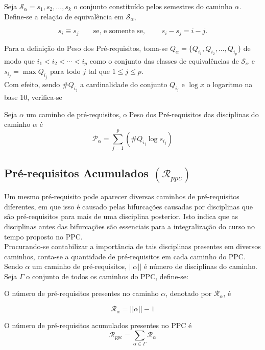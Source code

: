 \documentclass[a4paper, 12pt]{article}
\begin{document}
Seja $\mathcal{S}_\alpha = {s_1, s_2, \ldots, s_k}$ o conjunto constituído pelos semestres do caminho $\alpha$. Define-se a relação de equivalência em 
$\mathcal{S}_\alpha$, 

$$ s_i \equiv s_j \qquad \text{se, e somente se, } \qquad s_i - s_j = i - j. $$

Para a definição do Peso dos Pré-requisitos, toma-se $Q_\alpha = \{ Q_{i_1}, Q_{i_2}, \ldots, Q_{i_p} \}$ de modo que $i_1 < i_2 < \cdots < i_p$ como 
o conjunto das classes de equivalências de $\mathcal{S}_\alpha$ e $s_{i_j} = \max Q_{i_j}$ para todo $j$ tal que $1 \leq j \leq p$. \\

Com efeito, sendo $\#Q_{i_j}$ a cardinalidade do conjunto $Q_{i_j}$ e $\log{x}$ o logaritmo na base 10, verifica-se

\begin{definicao}
Seja $\alpha$ um caminho de pré-requisitos, o Peso dos Pré-requisitos das disciplinas do caminho $\alpha$ é
$$ \mathcal{P}_\alpha = \sum_{j=1}^p (\#Q_{i_j}\log{s_{i_j}}) $$
\end{definicao}


\subsection*{Pré-requisitos Acumulados $(\mathcal{R}_{ppc})$}
Um mesmo pré-requisito pode aparecer diversas caminhos de pré-requisitos diferentes, em que isso é causado pelas bifurcações causadas 
por disciplinas que são pré-requisitos para mais de uma disciplina posterior. Isto indica que as disciplinas antes das bifurcações são essenciais 
para a integralização do curso no tempo proposto no PPC. \\

Procurando-se contabilizar a importância de tais disciplinas presentes em diversos caminhos, conta-se a quantidade de pré-requisitos em cada 
caminho do PPC. Sendo $\alpha$ um caminho de pré-requisitos, $||\alpha||$ é número de disciplinas do caminho. Seja $\Gamma$ o conjunto de todos 
os caminhos do PPC, define-se:

\begin{definicao}
O número de pré-requisitos presentes no caminho $\alpha$, denotado por $\mathcal{R}_\alpha$, é

$$ \mathcal{R}_\alpha = ||\alpha|| - 1 $$
\end{definicao}

\begin{definicao}
O número de pré-requisitos acumulados presentes no PPC é
$$ \mathcal{R}_{ppc} = \sum_{\alpha \in \Gamma} \mathcal{R}_\alpha $$
\end{definicao}
\end{document}
